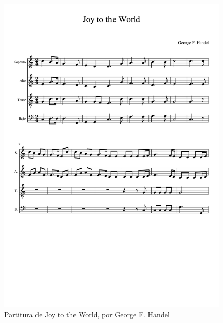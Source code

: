     \begin{figure}
    	\centering
    	\includegraphics[width=0.8\linewidth]{imagenes/scores/Joy_to_the_World.pdf}
    	\caption{Partitura de Joy to the World, por George F. Handel}
    	\label{fig:joy_score}
    \end{figure}
 
